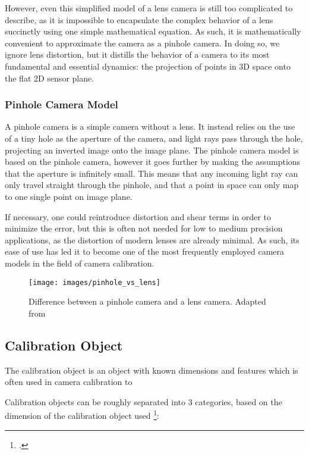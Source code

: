 However, even this simplified model of a lens camera is still too complicated to describe, as it is impossible to encapsulate the complex behavior of a lens succinctly using one simple mathematical equation. As such, it is mathematically convenient to approximate the camera as a pinhole camera. In doing so, we ignore lens distortion, but it distills the behavior of a camera to its most fundamental and essential dynamics: the projection of points in 3D space onto the flat 2D sensor plane. 

\subsubsection{Pinhole Camera Model}

A pinhole camera is a simple camera without a lens. It instead relies on the use of a tiny hole as the aperture of the camera, and light rays pass through the hole, projecting an inverted image onto the image plane. The pinhole camera model is based on the pinhole camera, however it goes further by making the assumptions that the aperture is infinitely small. This means that any incoming light ray can only travel straight through the pinhole, and that a point in space can only map to one single point on image plane. 

If necessary, one could reintroduce distortion and shear terms in order to minimize the error, but this is often not needed for low to medium precision applications, as the distortion of modern lenses are already minimal. As such, its ease of use has led it to become one of the most frequently employed camera models in the field of camera calibration. 

\begin{figure}
    \centering
    \texttt{[image: images/pinhole\_vs\_lens]}
    \caption{Difference between a pinhole camera and a lens camera. Adapted from \cite{leCameraModel2018}}
\end{figure}

\subsection{Calibration Object}

The calibration object is an object with known dimensions and features which is often used in camera calibration to 


Calibration objects can be roughly separated into 3 categories, based on the dimension of the calibration object used \footcite{zhangCameraCalibration2007}:


